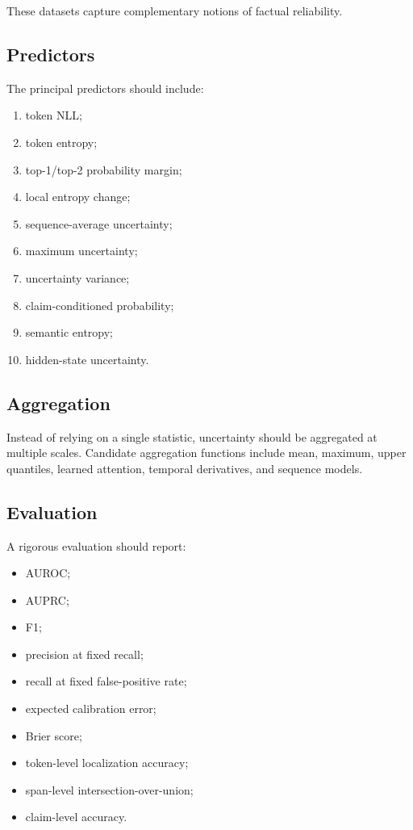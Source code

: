 \documentclass[11pt]{article}
\begin{document}
These datasets capture complementary notions of factual reliability.

\subsection{Predictors}
\label{sec:framework-predictors}

The principal predictors should include:

\begin{enumerate}
    \item token NLL;
    \item token entropy;
    \item top-1/top-2 probability margin;
    \item local entropy change;
    \item sequence-average uncertainty;
    \item maximum uncertainty;
    \item uncertainty variance;
    \item claim-conditioned probability;
    \item semantic entropy;
    \item hidden-state uncertainty.
\end{enumerate}

\subsection{Aggregation}
\label{sec:framework-aggregation}

Instead of relying on a single statistic, uncertainty should be aggregated at multiple scales. Candidate aggregation functions include mean, maximum, upper quantiles, learned attention, temporal derivatives, and sequence models.

\subsection{Evaluation}
\label{sec:framework-evaluation}

A rigorous evaluation should report:

\begin{itemize}
    \item AUROC;
    \item AUPRC;
    \item F1;
    \item precision at fixed recall;
    \item recall at fixed false-positive rate;
    \item expected calibration error;
    \item Brier score;
    \item token-level localization accuracy;
    \item span-level intersection-over-union;
    \item claim-level accuracy.
\end{itemize}
\end{document}
